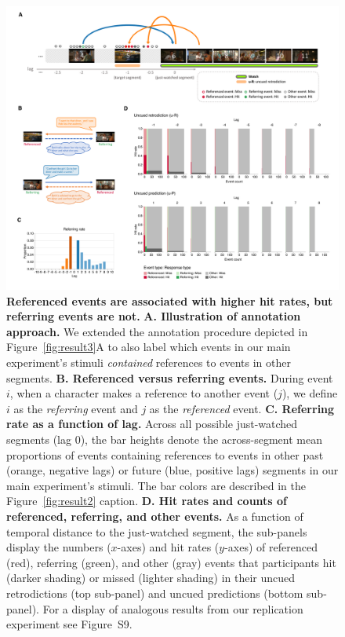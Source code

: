 \documentclass[10pt]{article}
\newcommand{\referringReferenced}{S9}
\begin{document}
\begin{figure}[tp]
  \centering
  \includegraphics[width=\textwidth]{results5}

  \caption{\textbf{Referenced events are associated with higher hit rates, but referring events are not.} \textbf{A. Illustration of annotation approach.} We extended the annotation procedure depicted in Figure~\ref{fig:result3}A to also label which events in our main experiment's stimuli \textit{contained} references to events in other segments. \textbf{B. Referenced versus referring events.} During event $i$, when a character makes a reference to another event ($j$), we define $i$ as the \textit{referring} event and $j$ as the \textit{referenced} event. \textbf{C. Referring rate as a function of lag.} Across all possible just-watched segments (lag 0), the bar heights denote the across-segment mean proportions of events containing references to events in other past (orange, negative lags) or future (blue, positive lags) segments in our main experiment's stimuli. The bar colors are described in the Figure~\ref{fig:result2} caption. \textbf{D. Hit rates and counts of referenced, referring, and other events.} As a function of temporal distance to the just-watched segment, the sub-panels display the numbers ($x$-axes) and hit rates ($y$-axes) of referenced (red), referring (green), and other (gray) events that participants hit (darker shading) or missed (lighter shading) in their uncued retrodictions (top sub-panel) and uncued predictions (bottom sub-panel). For a display of analogous results from our replication experiment see Figure~\referringReferenced.}

  \label{fig:result5}
\end{figure}
\end{document}
